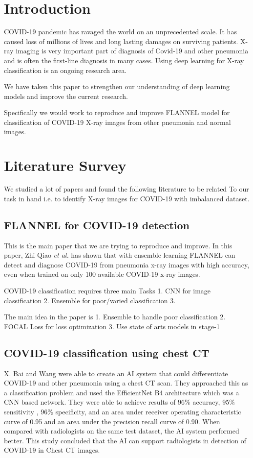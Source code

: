\documentclass{sigkddExp}
\begin{document}
\section{Introduction}
COVID-19 pandemic has ravaged the world on an unprecedented scale. It has caused loss
of millions of lives and long lasting damages on surviving patients. X-ray imaging
is very important part of diagnosis of Covid-19 and other pneumonia and is often the
first-line diagnosis in many cases. Using deep learning for X-ray classification is
an ongoing research area.

We have taken this paper to strengthen our understanding of
deep learning models and improve the current research.

Specifically we would work to reproduce and improve FLANNEL model for
classification of COVID-19 X-ray images from other pneumonia and normal images.

\section{Literature Survey}

We studied a lot of papers and found the following literature to be related To
our task in hand i.e. to identify X-ray images for COVID-19 with imbalanced
dataset.

\subsection{FLANNEL for COVID-19 detection}

This is the main paper\cite{10.1093/jamia/ocaa280} that we are trying to reproduce and improve.
In this paper, Zhi Qiao \textit{et al.} has shown that with ensemble learning
FLANNEL can detect and diagnose COVID-19 from pneumonia x-ray images with
high accuracy, even when trained on only 100 available COVID-19 x-ray images.

COVID-19 classification requires three main Tasks
1. CNN for image classification
2. Ensemble for poor/varied classification
3. 

The main idea in the paper is
1. Ensemble to handle poor classification
2. FOCAL Loss for loss optimization
3. Use state of arts models in stage-1


\subsection{COVID-19 classification using chest CT}

X. Bai and Wang \cite{pmid32339081} were able to create an AI system that could
differentiate COVID-19 and other pneumonia using a chest CT scan. They
approached this as a classification problem and used the EfficientNet B4
architecture which was a CNN based network. They were able to achieve results of
96\% accuracy, 95\% sensitivity , 96\% specificity, and an area under receiver
operating characteristic curve of 0.95 and an area under the precision recall
curve of 0.90. When compared with radiologists on the same test dataset, the AI
system performed better. This study concluded that the AI can support
radiologists in detection of COVID-19 in Chest CT images.
\end{document}
